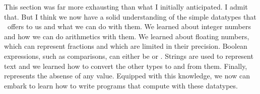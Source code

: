 %
%
This section was far more exhausting than what I initially anticipated.
I admit that.
But I think we now have a solid understanding of the simple datatypes that \python\ offers to us and what we can do with them.
We learned about integer numbers and how we can do arithmetics with them.
We learned about floating numbers, which can represent fractions and which are limited in their precision.
Boolean expressions, such as comparisons, can either be  or .
Strings are used to represent text and we learned how to convert the other types to and from them.
Finally,  represents the absense of any value.
Equipped with this knowledge, we now can embark to learn how to write programs that compute with these datatypes.%
%
\endhsection%
%
